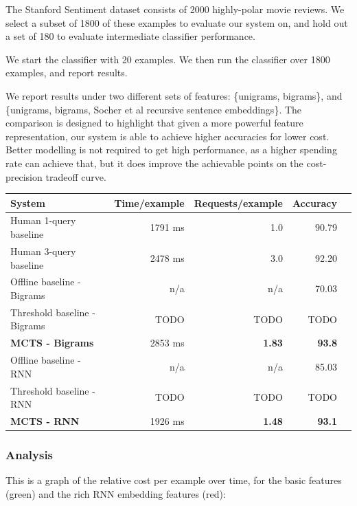 The Stanford Sentiment dataset  consists of 2000 highly-polar movie reviews. We select a subset of 1800 of these examples to evaluate our system on, and hold out a set of 180 to evaluate intermediate classifier performance.

We start the classifier with 20 examples. We then run the classifier over 1800 examples, and report results.

We report results under two different sets of features: \{unigrams, bigrams\}, and \{unigrams, bigrams, Socher et al recursive sentence embeddings\}. The comparison is designed to highlight that given a more powerful feature representation, our system is able to achieve higher accuracies for lower cost. Better modelling is not required to get high performance, as a higher spending rate can achieve that, but it does improve the achievable points on the cost-precision tradeoff curve.

\begin{center}
\begin{tabular}{ | l | r | r | r | r | }
    \hline
    \textbf{System} & \textbf{Time/example} & \textbf{Requests/example} & \textbf{Accuracy} \\ \hline
    Human 1-query baseline & 1791 ms & 1.0 & 90.79 \\ \hline
    Human 3-query baseline & 2478 ms & 3.0 & 92.20 \\ \hline
    Offline baseline - Bigrams & n/a & n/a & 70.03 \\ \hline
    Threshold baseline - Bigrams & TODO & TODO & TODO \\ \hline
    \textbf{MCTS - Bigrams} & 2853 ms & \textbf{1.83} & \textbf{93.8} \\ \hline
    Offline baseline - RNN & n/a & n/a & 85.03 \\ \hline
    Threshold baseline - RNN & TODO & TODO & TODO \\ \hline
    \textbf{MCTS - RNN} & 1926 ms & \textbf{1.48} & \textbf{93.1} \\ \hline
\end{tabular}
\end{center}

\subsubsection{Analysis}

This is a graph of the relative cost per example over time, for the basic features (green) and the rich RNN embedding features (red):

